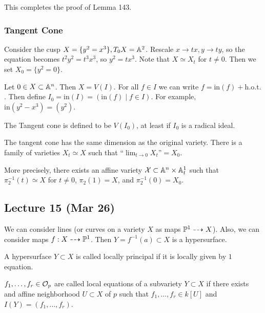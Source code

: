\documentclass[twoside, 10pt]{article}
\begin{document}
    This completes the proof of Lemma 143.

    \subsubsection{Tangent Cone}
    Consider the cusp $X = \{y^2 = x^3\}, T_0 X = \A^2$. Rescale $x \to tx, y \to ty$, so the equation becomes $t^2y^2 = t^3x^3$, so $y^2 = tx^3$. Note that $X \simeq X_t$ for $t \neq 0$. Then we set $X_0 = \{y^2 = 0\}$.

    Let $0 \in X \subset \A^n$. Then $X = V(I)$. For all $f \in I$ we can write $f = \mathrm{in}(f) + \mathrm{h.o.t.}$. Then define $I_0 = \mathrm{in}(I) = (\mathrm{in}(f) \mid f \in I)$. For example, $\mathrm{in}(y^2-x^3) = (y^2)$. 

    \begin{defn}
        The Tangent cone is defined to be $V(I_0)$, at least if $I_0$ is a radical ideal.
    \end{defn}

    \begin{thm}
        The tangent cone has the same dimension as the original variety. There is a family of varieties $X_t \simeq X$ such that ``$\lim_{t \to 0} X_t$''$= X_0$.
    \end{thm}

    More precisely, there exists an affine variety $\mc{X} \subset \A^n \times \A^1_t$ such that $\pi_2^{-1}(t) \simeq X$ for $t \neq 0$, $\pi_2(1) = X$, and $\pi_2^{-1}(0) = X_0$.

    \subsection{Lecture 15 (Mar 26)}
    We can consider lines (or curves on a variety $X$ as maps $\P^1 \dashrightarrow X$). Also, we can consider maps $f: X \dashrightarrow \P^1$. Then $Y = f^{-1}(a) \subset X$ is a hypersurface.

    \begin{defn}
        A hypersurface $Y \subset X$ is called locally principal if it is locally given by $1$ equation.
    \end{defn}

    \begin{defn}
        $f_1, \ldots, f_r \in \mc{O}_p$ are called local equations of a subvariety $Y \subset X$ if there exists and affine neighborhood $U \subset X$ of $p$ such that $f_1, \ldots, f_r \in k[U]$ and $I(Y) = (f_1, \ldots, f_r)$.
    \end{defn}
\end{document}

